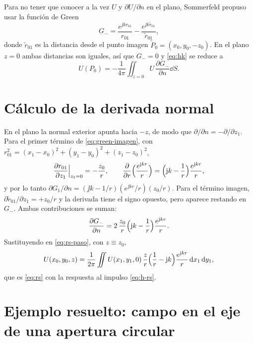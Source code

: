Para no tener que conocer a la vez $U$ y $\partial U/\partial n$ en el plano, Sommerfeld propuso
usar la función de Green
\begin{equation}
  G_-=\frac{e^{\jj kr_{01}}}{r_{01}}-\frac{e^{\jj k\tilde r_{01}}}{\tilde r_{01}},
  \label{eq:green-imagen}
\end{equation}
donde $\tilde r_{01}$ es la distancia desde el punto imagen $\tilde P_0=(x_0,y_0,-z_0)$. En el
plano $z=0$ ambas distancias son iguales, así que $G_-=0$ y \eqref{eq:hk} se reduce a
\begin{equation}
  U(P_0)=-\frac{1}{4\pi}\iint_{z=0}U\,\frac{\partial G_-}{\partial n}\dd S .
  \label{eq:rs-paso}
\end{equation}

\section{Cálculo de la derivada normal}

En el plano la normal exterior apunta hacia $-z$, de modo que $\partial/\partial n=-\partial/\partial z_1$.
Para el primer término de \eqref{eq:green-imagen}, con
$r_{01}^2=(x_1-x_0)^2+(y_1-y_0)^2+(z_1-z_0)^2$,
\[
  \frac{\partial r_{01}}{\partial z_1}\Big|_{z_1=0}=-\frac{z_0}{r},\qquad
  \frac{\partial}{\partial r}\Bigl(\frac{e^{\mathrm{j} kr}}{r}\Bigr)=\Bigl(\mathrm{j} k-\frac1r\Bigr)\frac{e^{\mathrm{j} kr}}{r},
\]
y por lo tanto $\partial G_1/\partial n=(\jj k-1/r)(e^{\jj kr}/r)(z_0/r)$. Para el término imagen,
$\partial\tilde r_{01}/\partial z_1=+z_0/r$ y la derivada tiene el signo opuesto, pero aparece
restando en $G_-$. Ambas contribuciones se suman:
\begin{equation}
  \frac{\partial G_-}{\partial n}=2\,\frac{z_0}{r}\Bigl(\mathrm{j} k-\frac1r\Bigr)\frac{e^{\mathrm{j} kr}}{r}.
  \label{eq:dgdn}
\end{equation}
Sustituyendo en \eqref{eq:rs-paso}, con $z\equiv z_0$,
\begin{equation}
  U(x_0,y_0,z)=\frac{1}{2\pi}\iint U(x_1,y_1,0)\,\frac{z}{r}\Bigl(\frac1r-\mathrm{j} k\Bigr)\frac{e^{\mathrm{j} kr}}{r}\,\mathrm{d} x_1\,\mathrm{d} y_1,
\end{equation}
que es \eqref{eq:rs} con la respuesta al impulso \eqref{eq:h-rs}.

\section{Ejemplo resuelto: campo en el eje de una apertura circular}\label{sec:circular}

